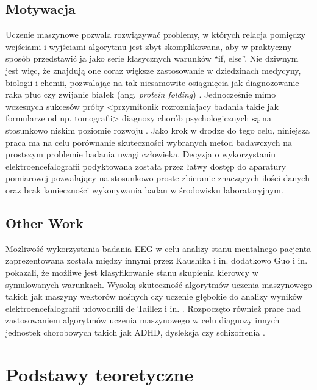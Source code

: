 \documentclass{./assets/wfis}
\begin{document}
\section{Motywacja}
Uczenie maszynowe pozwala rozwiązywać problemy, w których relacja pomiędzy wejściami i wyjściami algorytmu jest zbyt skomplikowana, aby w praktyczny sposób przedstawić ja jako serie klasycznych warunków “if, else”. Nie dziwnym jest więc, że znajdują one coraz większe zastosowanie w dziedzinach medycyny, biologii i chemii, pozwalając na tak niesamowite osiągnięcia jak diagnozowanie raka płuc \cite{li_machine_2022} czy zwijanie białek (ang. \textit{protein folding}) \cite{jumper_highly_2021}. Jednocześnie mimo wczesnych sukcesów \cite{some comparasion} próby <przymitonik rozrozniajacy badania takie jak formularze od np. tomografii> diagnozy chorób psychologicznych są na stosunkowo niskim poziomie rozwoju \cite{badania adhd i podobne}. Jako krok w drodze do tego celu, niniejsza praca ma na celu porównanie skuteczności wybranych metod badawczych na prostszym problemie badania uwagi człowieka. Decyzja o wykorzystaniu elektroencefalografii podyktowana została przez łatwy dostęp do aparatury pomiarowej pozwalający na stosunkowo proste zbieranie znaczących ilości danych oraz brak konieczności wykonywania badan w środowisku laboratoryjnym.

\section{Other Work}
Możliwość wykorzystania badania EEG w celu analizy stanu mentalnego pacjenta zaprezentowana została między innymi przez Kaushika i in. \cite{kaushik_decoding_2022} dodatkowo Guo i in. \cite{guo_detection_2018} pokazali, że możliwe jest klasyfikowanie stanu skupienia kierowcy w symulowanych warunkach. Wysoką skuteczność algorytmów uczenia maszynowego takich jak maszyny wektorów nośnych czy uczenie głębokie do analizy wyników elektroencefalografii udowodnili de Taillez i in. \cite{de_taillez_machine_2020}. Rozpoczęto również prace nad zastosowaniem algorytmów uczenia maszynowego w celu diagnozy innych jednostek chorobowych takich jak ADHD, dysleksja czy schizofrenia \cite{ahire_comprehensive_2022, joshi_review_2021, clarke_eeg_2002}.


\chapter{Podstawy teoretyczne}
\end{document}
